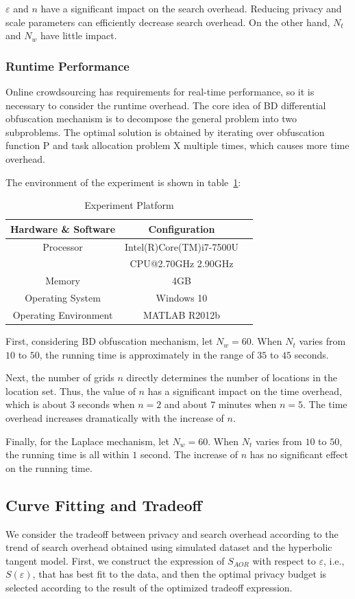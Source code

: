 $\varepsilon$ and $n$ have a significant impact on the search overhead. Reducing privacy and scale parameters can efficiently decrease search overhead. On the other hand, $N_t$ and $N_w$ have little impact.

\subsubsection{Runtime Performance}
Online crowdsourcing has requirements for real-time performance, so it is necessary to consider the runtime overhead. The core idea of BD differential obfuscation mechanism is to decompose the general problem into two subproblems. The optimal solution is obtained by iterating over obfuscation function P and task allocation problem X multiple times, which causes more time overhead.

The environment of the experiment is shown in table~\ref{tab:envi}:
\begin{table}
  \caption{Experiment Platform}
  \label{tab:envi}
  \begin{tabular}{ccl}
    \toprule
    Hardware \& Software & Configuration\\
    \midrule
    Processor & Intel(R)Core(TM)i7-7500U \\
              & CPU@2.70GHz 2.90GHz\\
    Memory & 4GB\\
    Operating System & Windows 10\\
    Operating Environment & MATLAB R2012b\\
  \bottomrule
\end{tabular}
\end{table}

First, considering BD obfuscation mechanism, let $N_w=60$. When $N_t$ varies from $10$ to $50$, the running time is approximately in the range of $35$ to $45$ seconds.

Next, the number of grids $n$ directly determines the number of locations in the location set. Thus, the value of $n$ has a significant impact on the time overhead, which is about $3$ seconds when $n=2$ and about $7$ minutes when $n=5$. The time overhead increases dramatically with the increase of $n$.

Finally, for the Laplace mechanism, let $N_w=60$. When $N_t$ varies from $10$ to $50$, the running time is all within $1$ second. The increase of $n$ has no significant effect on the running time.

\subsection{Curve Fitting and Tradeoff}
We consider the tradeoff between privacy and search overhead according to the trend of search overhead obtained using simulated dataset and the hyperbolic tangent model. First, we construct the expression of $S_{AOR}$ with respect to $\varepsilon$, i.e., $S(\varepsilon)$, that has best fit to the data, and then the optimal privacy budget is selected according to the result of the optimized tradeoff expression.

